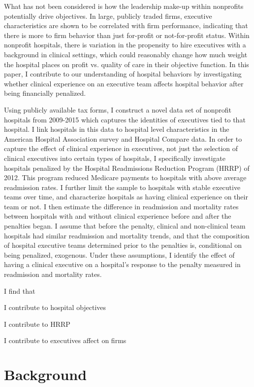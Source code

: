 \documentclass[12pt]{article}
\begin{document}
  What has not been considered is how the leadership make-up within nonprofits potentially drive objectives. In large, publicly traded firms, executive characteristics are shown to be correlated with firm performance, indicating that there is more to firm behavior than just for-profit or not-for-profit status. Within nonprofit hospitals, there is variation in the propensity to hire executives with a background in clinical settings, which could reasonably change how much weight the hospital places on profit vs. quality of care in their objective function. In this paper, I contribute to our understanding of hospital behaviors by investigating whether clinical experience on an executive team affects hospital behavior after being financially penalized.

  Using publicly available tax forms, I construct a novel data set of nonprofit hospitals from 2009-2015 which captures the identities of executives tied to that hospital. I link hospitals in this data to hospital level characteristics in the American Hospital Association survey and Hospital Compare data. In order to capture the effect of clinical experience in executives, not just the selection of clinical executives into certain types of hospitals, I specifically investigate hospitals penalized by the Hospital Readmissions Reduction Program (HRRP) of 2012. This program reduced Medicare payments to hospitals with above average readmission rates. I further limit the sample to hospitals with stable executive teams over time, and characterize hospitals as having clinical experience on their team or not. I then estimate the difference in readmission and mortality rates between hospitals with and without clinical experience before and after the penalties began. I assume that before the penalty, clinical and non-clinical team hospitals had similar readmission and mortality trends, and that the composition of hospital executive teams determined prior to the penalties is, conditional on being penalized, exogenous. Under these assumptions, I identify the effect of having a clinical executive on a hospital’s response to the penalty measured in readmission and mortality rates. 

    I find that

    I contribute to hospital objectives

    I contribute to HRRP

    I contribute to executives affect on firms

    

    \section{Background}
\end{document}
